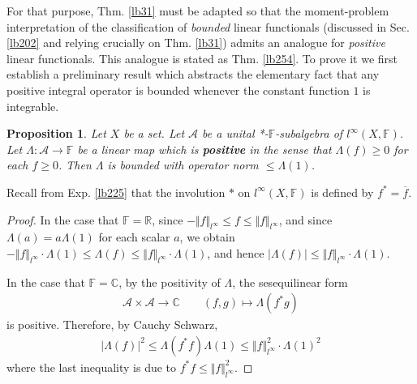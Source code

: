 \documentclass[12pt,b5paper,notitlepage]{article}
\theoremstyle{definition}
\theoremstyle{plain}
\newtheorem{pp}[df]{Proposition}
\newcommand{\ovl}{\overline}
\newcommand{\scr}{\mathscr}
\newcommand{\Cbb}{\mathbb C}
\newcommand{\Rbb}{\mathbb R}
\newcommand{\Fbb}{\mathbb F}
\numberwithin{equation}{section}
\begin{document}
For that purpose, Thm. \ref{lb31} must be adapted so that the moment-problem interpretation of the classification of \textit{bounded} linear functionals (discussed in Sec. \ref{lb202} and relying crucially on Thm. \ref{lb31}) admits an analogue for \textit{positive} linear functionals. This analogue is stated as Thm. \ref{lb254}. To prove it we first establish a preliminary result which abstracts the elementary fact that any positive integral operator is bounded whenever the constant function $1$ is integrable.








\begin{pp}\label{lb204}
Let $X$ be a set. Let $\scr A$ be a unital *-$\Fbb$-subalgebra of $l^\infty(X,\Fbb)$.  Let $\Lambda:\scr A\rightarrow\Fbb$ be a linear map which is \textbf{positive} in the sense that $\Lambda(f)\geq0$ for each $f\geq0$. Then $\Lambda$ is bounded with operator norm $\leq \Lambda(1)$. 
\end{pp}


Recall from Exp. \ref{lb225} that the involution $*$ on $l^\infty(X,\Fbb)$ is defined by $f^*=\ovl f$.


\begin{proof}
In the case that $\Fbb=\Rbb$, since $-\Vert f\Vert_{l^\infty}\leq f\leq\Vert f\Vert_{l^\infty}$, and since $\Lambda(a)=a\Lambda(1)$ for each scalar $a$, we obtain $-\Vert f\Vert_{l^\infty}\cdot\Lambda(1)\leq \Lambda(f)\leq\Vert f\Vert_{l^\infty}\cdot\Lambda(1)$, and hence $|\Lambda(f)|\leq\Vert f\Vert_{l^\infty}\cdot\Lambda(1)$.

In the case that $\Fbb=\Cbb$, by the positivity of $\Lambda$, the sesequilinear form
\begin{align*}
\scr A\times\scr A\rightarrow\Cbb\qquad (f,g)\mapsto \Lambda(f^*g)
\end{align*}
is positive. Therefore, by Cauchy Schwarz,
\begin{align*}
|\Lambda(f)|^2\leq\Lambda(f^*f)\Lambda(1)\leq\Vert f\Vert_{l^\infty}^2\cdot\Lambda(1)^2
\end{align*}
where the last inequality is due to $f^*f\leq \Vert f\Vert_{l^\infty}^2$. 
\end{proof}
\end{document}
